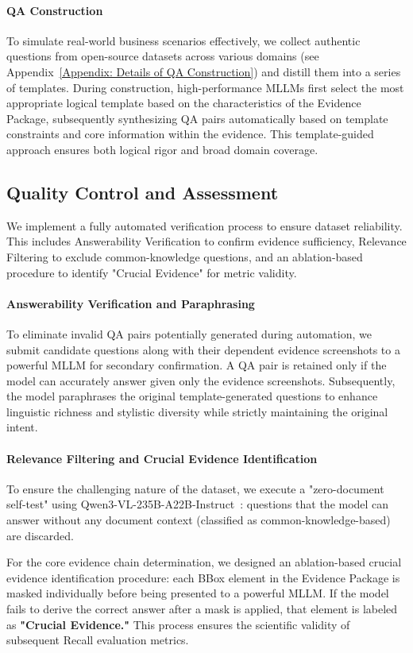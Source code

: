\documentclass[]{opendatalab}
\begin{document}
{\paragraph{QA Construction}
To simulate real-world business scenarios effectively, we collect authentic questions from open-source datasets across various domains (see Appendix~\ref{Appendix: Details of QA Construction}) and distill them into a series of templates. During construction, high-performance MLLMs first select the most appropriate logical template based on the characteristics of the Evidence Package, subsequently synthesizing QA pairs automatically based on template constraints and core information within the evidence. This template-guided approach ensures both logical rigor and broad domain coverage.

\subsection{Quality Control and Assessment}
We implement a fully automated verification process to ensure dataset reliability. This includes Answerability Verification to confirm evidence sufficiency, Relevance Filtering to exclude common-knowledge questions, and an ablation-based procedure to identify "Crucial Evidence" for metric validity.
\paragraph{Answerability Verification and Paraphrasing}
To eliminate invalid QA pairs potentially generated during automation, we submit candidate questions along with their dependent evidence screenshots to a powerful MLLM for secondary confirmation. A QA pair is retained only if the model can accurately answer given only the evidence screenshots. Subsequently, the model paraphrases the original template-generated questions to enhance linguistic richness and stylistic diversity while strictly maintaining the original intent.
\paragraph{Relevance Filtering and Crucial Evidence Identification}
To ensure the challenging nature of the dataset, we execute a "zero-document self-test" using Qwen3-VL-235B-A22B-Instruct~\citep{bai2025qwen3}: questions that the model can answer without any document context (classified as common-knowledge-based) are discarded.

For the core evidence chain determination, we designed an ablation-based crucial evidence identification procedure: each BBox element in the Evidence Package is masked individually before being presented to a powerful MLLM. If the model fails to derive the correct answer after a mask is applied, that element is labeled as \textbf{"Crucial Evidence."} This process ensures the scientific validity of subsequent Recall evaluation metrics.

}
\end{document}
